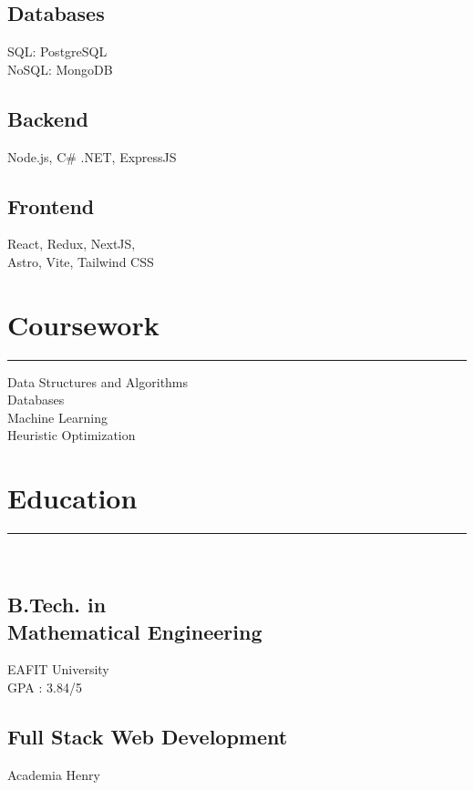 \documentclass[]{rahulworld-resume}
\begin{document}
\begin{minipage}[t]{0.33\textwidth}
    \subsection{Databases}
    SQL: PostgreSQL\\
    NoSQL: MongoDB\\
    \vspace{1pt}
    \subsection{Backend}
    Node.js, C\# .NET, ExpressJS\\
    \subsection{Frontend}
    React, Redux, NextJS, \\
    Astro, Vite, Tailwind CSS\\

    \sectionsep
    \section{Coursework}
    \noindent\rule{5cm}{0.4pt}

    Data Structures and Algorithms\\
    Databases\\
    Machine Learning\\
    Heuristic Optimization\\
    \sectionsep
    \section{Education}
    \noindent\rule{3cm}{0.4pt}\\
    \subsection{B.Tech. in \\
        Mathematical Engineering} EAFIT University \\
    GPA : 3.84/5\\

    \subsection{Full Stack Web Development}
    Academia Henry


\end{minipage}
\end{document}
